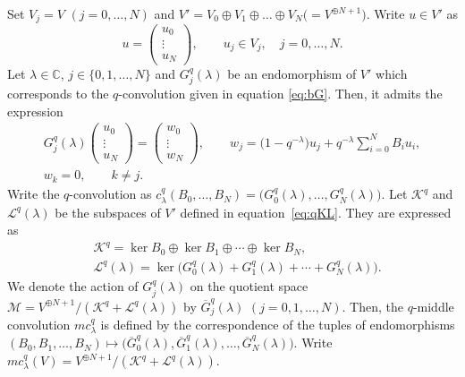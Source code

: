 \documentclass[pdftex]{sigma}
\numberwithin{equation}{section}
\theoremstyle{definition}
\begin{document}
Set $V_{j} =V$ $(j=0,\dots ,N)$ and $V' = V_0 \oplus V_{1} \oplus \dots \oplus V_{N} \bigl(= V^{\oplus N+1}\bigr)$.
Write $u \in V'$ as
\begin{equation*}
 u = \begin{pmatrix} u_{0} \\ \vdots \\ u_{N} \end{pmatrix}, \qquad u_j \in V_j , \quad j=0,\dots , N.
\end{equation*}
Let $\lambda \in \mathbb{C} $, $j \in \{ 0,1, \dots ,N \}$ and $G_j^{q} (\lambda )$ be an endomorphism of $V'$ which corresponds to the $q$-convolution given in equation \eqref{eq:bG}.
Then, it admits the expression
\begin{gather}
G_j^{q} (\lambda ) \begin{pmatrix} u_{0} \\ \vdots \\ u_{N} \end{pmatrix} =\begin{pmatrix} w_{0} \\ \vdots \\ w_{N} \end{pmatrix}, \qquad w_j = \bigl(1- q^{-\lambda } \bigr) u_j + q^{-\lambda } \sum _{i=0}^{N} B_i u_i, \nonumber\\ w _k =0, \qquad k\neq j.
\label{eq:Gjq}
\end{gather}
Write the $q$-convolution as
$
c_\lambda ^{q} (B_0, \dots , B_N ) = \bigl( G_0^{q} (\lambda ), \dots , G_N^{q} (\lambda )\bigr) $.
Let $ \mathcal{K}^{q} $ and $\mathcal{L} ^{q} ( \lambda ) $ be the subspaces of $V'$ defined in equation~\eqref{eq:qKL}.
They are expressed as
\begin{align*}
& \mathcal{K}^{q} = \operatorname{ker}B_0 \oplus \operatorname{ker}B_1 \oplus \cdots \oplus \operatorname{ker}B_N, \\
& \mathcal{L}^{q} ( \lambda ) = \operatorname{ker}\bigl(G_0^{q} (\lambda ) +G_1^{q} (\lambda ) + \cdots + G_N^{q} (\lambda ) \bigr).
\end{align*}
We denote the action of $G_j^{q} (\lambda ) $ on the quotient space $ {\mathcal M } = V^{\oplus N+1}/( \mathcal{K}^{q} + \mathcal{L}^{q} ( \lambda ) )$ by $\overline{G}_j^{q} (\lambda )$ $(j=0 ,1, \dots ,N )$.
Then, the $q$-middle convolution $mc_\lambda ^{q}$ is defined by the correspondence of the tuples of endomorphisms $ (B_{0}, B_{1} ,\dots ,B_N ) \mapsto \bigl( \overline{G}_0^{q} (\lambda ) , \overline{G}_1^{q} (\lambda ) ,\dots ,\overline{G}_N^{q} (\lambda )\bigr) $.
Write $mc_\lambda ^{q} (V) = V^{\oplus N+1}/( \mathcal{K}^{q} + \mathcal{L}^{q} ( \lambda ) ) $.
\end{document}
